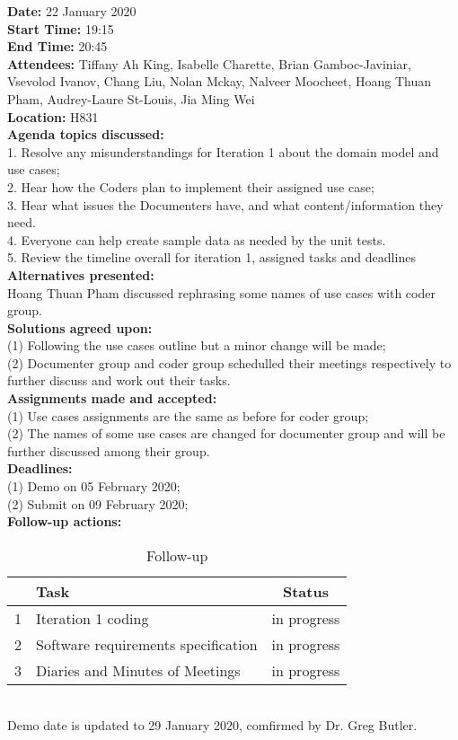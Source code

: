 \documentclass[12pt]{article}
\begin{document}
\newpage
{\bf Date:} 22 January 2020\\
{\bf Start Time:} 19:15\\
{\bf End Time:}  20:45\\
{\bf Attendees:} Tiffany Ah King,
Isabelle Charette,
Brian Gamboc-Javiniar,
Vsevolod Ivanov,
Chang Liu,
Nolan Mckay,
Nalveer Moocheet,
Hoang Thuan Pham,
Audrey-Laure St-Louis,
Jia Ming Wei\\
{\bf Location:} H831 \\
{\bf Agenda topics discussed:} \\1. Resolve any misunderstandings for Iteration 1 about the domain model and use cases;
\\2. Hear how the Coders plan to implement their assigned use case;
\\3. Hear what issues the Documenters have, and what content/information they need. 
\\4. Everyone can help create sample data as needed by the unit tests. 
\\5. Review the timeline overall for iteration 1, assigned tasks and deadlines\\
{\bf Alternatives presented:} \\ Hoang Thuan Pham discussed rephrasing some names of use cases with coder group.\\
{\bf Solutions agreed upon:} \\(1) Following the use cases outline but a minor change will be made; \\(2) Documenter group and coder group schedulled their meetings respectively to further discuss and work out their tasks. \\
{\bf Assignments made and accepted:} \\(1) Use cases assignments are the same as before for coder group;\\(2) The names of some use cases are changed for documenter group and will be further discussed among their group.\\
{\bf Deadlines:} \\(1) Demo on 05 February 2020; \\(2)  Submit on 09 February 2020; \\
{\bf Follow-up actions:} \\
\begin{table}[h!]
\centering
 \begin{tabular}{||l l c ||} 
 \hline
   & Task & Status\\ [0.5ex] 
 \hline\hline
 1 & Iteration 1 coding & in progress \\ 
 2 & Software requirements specification &  in progress\\
 3 & Diaries and Minutes of Meetings &  in progress\\[1ex] 

 \hline
 \end{tabular}
\caption{Follow-up }
\label{table:1}
\end{table}
\\Demo date is updated to 29 January 2020, comfirmed by Dr. Greg Butler.\\
\end{document}
